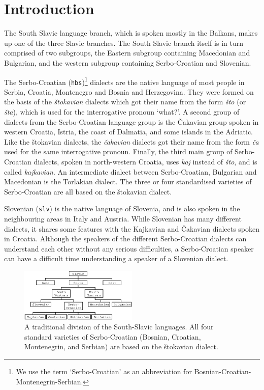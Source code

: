 
\section{Introduction}

The South Slavic language branch, which is spoken mostly in the
Balkans, makes up one of the three Slavic branches. The South Slavic
branch itself is in turn comprised of two subgroups, the Eastern subgroup
containing Macedonian and Bulgarian, and the western subgroup
containing Serbo-Croatian and Slovenian.

The Serbo-Croatian (\texttt{hbs})\footnote{We use the term `Serbo-Croatian' as an abbreviation for
Bosnian-Croatian-Montenegrin-Serbian.} 
dialects are the native language of most people in Serbia, Croatia, 
Montenegro and Bosnia and Herzegovina. They were formed on the basis of the \emph{štokavian} dialects 
which got their name from the form \emph{što} (or \emph{šta}), which is used for the 
interrogative pronoun `what?'. A second group of dialects from the Serbo-Croatian language group 
is the Čakavian group spoken in western Croatia, Istria, the coast of Dalmatia, and some 
islands in the Adriatic. Like the štokavian dialects, the \emph{čakavian} dialects got their name 
from the form \emph{ča} used for the same interrogative pronoun. Finally, the third main group 
of Serbo-Croatian dialects, spoken in north-western Croatia, uses \emph{kaj} instead of \emph{što}, 
and is called \emph{kajkavian}.
An intermediate dialect between Serbo-Croatian, Bulgarian and Macedonian is the Torlakian dialect.
The three or four standardised varieties of Serbo-Croatian are all based on the štokavian dialect.

Slovenian (\texttt{slv}) is the native language of Slovenia, and is
also spoken in the neighbouring areas in Italy and Austria. While
Slovenian has many different dialects, it shares some features with
the Kajkavian and Čakavian dialects spoken in Croatia. Although the
speakers of the different Serbo-Croatian dialects can understand each
other without any serious difficulties, a Serbo-Croatian speaker can
have a difficult time understanding a speaker of a Slovenian dialect.

\begin{figure}
\centering
\includegraphics[width=0.5\textwidth]{images/chart.eps}
\caption{A traditional division of the South-Slavic languages. All four standard varieties
     of Serbo-Croatian (Bosnian, Croatian, Montenegrin, and Serbian) are based on the 
     štokavian dialect.}
\end{figure}

